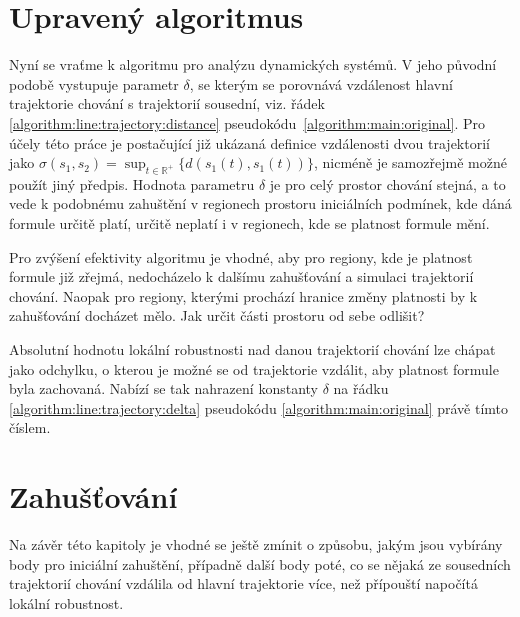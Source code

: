 \section{Upravený algoritmus}\label{section:algorithm:updated}

Nyní se vraťme k algoritmu pro analýzu dynamických systémů. V jeho původní podobě
vystupuje parametr $\delta$, se kterým se porovnává vzdálenost hlavní trajektorie chování
s trajektorií sousední, viz. řádek \ref{algorithm:line:trajectory:distance}
pseudokódu~\ref{algorithm:main:original}. Pro účely této práce je postačující již ukázaná
definice vzdálenosti dvou trajektorií jako $\sigma(s_1, s_2) = {\displaystyle \sup_{t \in \mathbb{R}^{+}}} \{d(s_1(t), s_1(t))\}$,
nicméně je samozřejmě mož\-né použít jiný předpis. Hodnota parametru $\delta$ je pro celý prostor
chování stejná, a to vede k podobnému zahuštění v regionech prostoru iniciálních pod\-mí\-nek,
kde dáná formule určitě platí, určitě neplatí i v regionech, kde se platnost formule mění.

Pro zvýšení efektivity algoritmu je vhodné, aby pro regiony, kde je platnost formule již zřejmá,
nedocházelo k dalšímu zahušťování a simulaci trajektorií chování. Naopak pro regiony, kterými prochází
hranice změny platnosti by k zahušťování docházet mělo. Jak určit části prostoru od sebe odlišit?

Absolutní hodnotu lokální robustnosti nad danou trajektorií chování lze chápat
jako odchylku, o kterou je možné se od trajektorie vzdálit, aby platnost
formule byla zachovaná. Nabízí se tak nahrazení konstanty $\delta$ na řádku \ref{algorithm:line:trajectory:delta} pseudokódu \ref{algorithm:main:original}
právě tímto číslem.

\section{Zahušťování}

Na závěr této kapitoly je vhodné se ještě zmínit o způsobu, jakým jsou vybírány
body pro iniciální zahuštění, případně další body poté, co se nějaká ze sousedních trajektorií
chování vzdálila od hlavní trajektorie více, než přípouští napočítá lokální 
robustnost.

